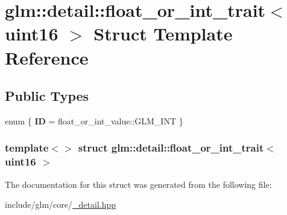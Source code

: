 \hypertarget{structglm_1_1detail_1_1float__or__int__trait_3_01uint16_01_4}{\section{glm\-:\-:detail\-:\-:float\-\_\-or\-\_\-int\-\_\-trait$<$ uint16 $>$ \-Struct \-Template \-Reference}
\label{structglm_1_1detail_1_1float__or__int__trait_3_01uint16_01_4}
}
\subsection*{\-Public \-Types}
\begin{DoxyCompactItemize}
\item 
enum \{ {\bfseries \-I\-D} =  float\-\_\-or\-\_\-int\-\_\-value\-:\-:\-G\-L\-M\-\_\-\-I\-N\-T
 \}
\end{DoxyCompactItemize}
\subsubsection*{template$<$$>$ struct glm\-::detail\-::float\-\_\-or\-\_\-int\-\_\-trait$<$ uint16 $>$}



\-The documentation for this struct was generated from the following file\-:\begin{DoxyCompactItemize}
\item 
include/glm/core/\hyperlink{__detail_8hpp}{\-\_\-detail.\-hpp}\end{DoxyCompactItemize}
